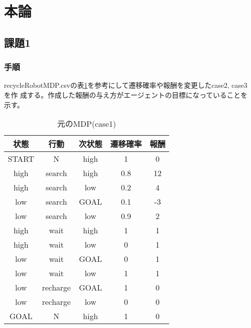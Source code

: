 \section{本論}
\subsection{課題1}
\subsubsection{手順}
recycleRobotMDP.csvの表\ref{table:1}を参考にして遷移確率や報酬を変更したcase2, case3を作
成する。作成した報酬の与え方がエージェントの目標になっていることを示す。
\begin{table}[hbtp]
  \begin{minipage}[t]{\hsize}
  \centering
  \caption{元のMDP(case1)}
  \label{table:1}
    \begin{tabular}{|c|c|c|c|c|}
      \hline
      状態 & 行動 & 次状態 & 遷移確率 & 報酬\\
      \hline
      \hline
      START & N & high & 1 & 0 \\
      \hline
      high & search & high & 0.8 & 12 \\
      high & search & low & 0.2 & 4 \\
      \hline
      low & search & GOAL & 0.1 & -3 \\
      low & search & low & 0.9 & 2 \\
      \hline
      high & wait & high & 1 & 1 \\
      high & wait & low & 0 & 1 \\
      \hline
      low & wait & GOAL & 0 & 1 \\
      low & wait & low & 1 & 1 \\
      \hline
      low & recharge & GOAL & 1 & 0 \\
      low & recharge & low & 0 & 0 \\
      \hline
      GOAL & N & high & 1 & 0 \\
      \hline
    \end{tabular}
  \end{minipage}
\end{table}


